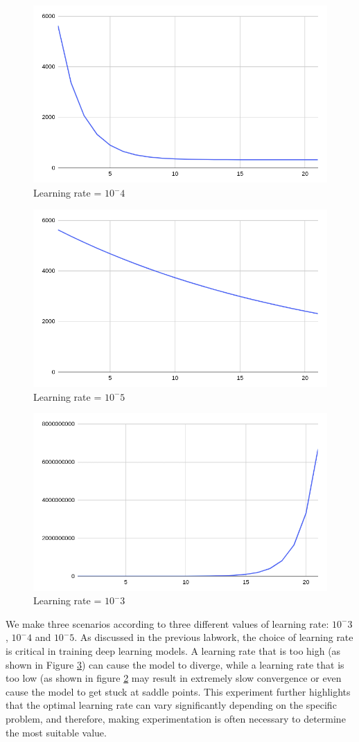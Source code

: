 \documentclass{article}
\begin{document}
\begin{figure}[H]
    \centering
    \includegraphics[width=0.75\linewidth]{image/lr01.png}
    \caption{Learning rate = $10^-4$}
    \label{fig:lr01}
\end{figure}


\begin{figure}[H]
    \centering
    \includegraphics[width=0.75\linewidth]{image/lr11.png}
    \caption{Learning rate = $10^-5$}
    \label{fig:lr001}
\end{figure}

\begin{figure}[H]
    \centering
    \includegraphics[width=0.75\linewidth]{image/lr001.png}
    \caption{Learning rate = $10^-3$}
    \label{fig:lr11}
\end{figure}


We make three scenarios according to three different values of learning rate: $10^-3$, $10^-4$ and $10^-5$. As discussed in the previous labwork, the choice of learning rate is critical in training deep learning models. A learning rate that is too high (as shown in Figure \ref{fig:lr11}) can cause the model to diverge, while a learning rate that is too low (as shown in figure \ref{fig:lr001} may result in extremely slow convergence or even cause the model to get stuck at saddle points. This experiment further highlights that the optimal learning rate can vary significantly depending on the specific problem, and therefore, making experimentation is often necessary to determine the most suitable value.
\end{document}
